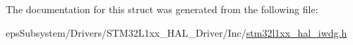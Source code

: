 The documentation for this struct was generated from the following file\-:\begin{DoxyCompactItemize}
\item 
eps\-Subsystem/\-Drivers/\-S\-T\-M32\-L1xx\-\_\-\-H\-A\-L\-\_\-\-Driver/\-Inc/\hyperlink{stm32l1xx__hal__iwdg_8h}{stm32l1xx\-\_\-hal\-\_\-iwdg.\-h}\end{DoxyCompactItemize}

